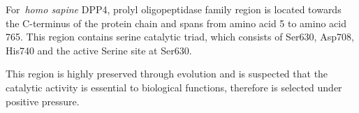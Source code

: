 For~\textit{homo sapine} DPP4, prolyl oligopeptidase family region is located towards the C-terminus of the protein chain and spans from amino acid 5 to amino acid 765. This region contains serine catalytic triad, which consists of Ser630, Asp708, His740 and the active Serine site at Ser630. \par
This region is highly preserved through evolution and is suspected that the catalytic activity is essential to biological functions, therefore is selected under positive pressure. 